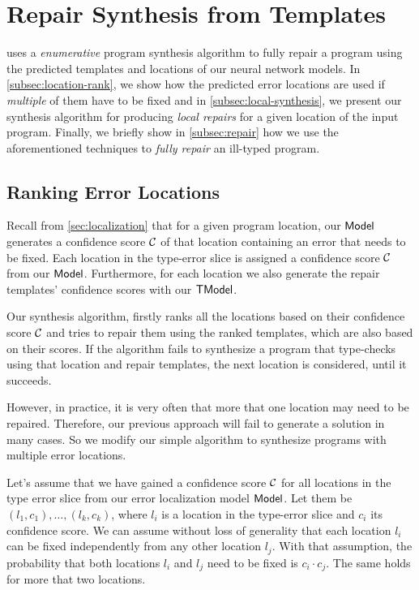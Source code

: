\section{Repair Synthesis from Templates}
\label{sec:synthesis}
\toolname uses a \emph{enumerative} program synthesis algorithm to fully repair
a program using the predicted templates and locations of our neural network
models. In \autoref{subsec:location-rank}, we show how the predicted error
locations are used if \emph{multiple} of them have to be fixed and in
\autoref{subsec:local-synthesis}, we present our synthesis algorithm for
producing \emph{local repairs} for a given location of the input program.
Finally, we briefly show in \autoref{subsec:repair} how we use the
aforementioned techniques to \emph{fully repair} an ill-typed program.

\subsection{Ranking Error Locations}
\label{subsec:location-rank}

Recall from \autoref{sec:localization} that for a given program location, our
$\mathsf{Model}$ generates a confidence score $\mathcal{C}$ of that location containing an
error that needs to be fixed. Each location in the type-error slice is assigned
a confidence score $\mathcal{C}$ from our $\mathsf{Model}$. Furthermore, for each location we
also generate the repair templates' confidence scores with our $\mathsf{TModel}$.

Our synthesis algorithm, firstly ranks all the locations based on their
confidence score $\mathcal{C}$ and tries to repair them using the ranked templates,
which are also based on their scores. If the algorithm fails to synthesize a
program that type-checks using that location and repair templates, the next
location is considered, until it succeeds.

However, in practice, it is very often that more that one location may need to
be repaired. Therefore, our previous approach will fail to generate a solution
in many cases. So we modify our simple algorithm to synthesize programs with
multiple error locations.

Let's assume that we have gained a confidence score $\mathcal{C}$ for all locations
in the type error slice from our error localization model $\mathsf{Model}$. Let them be
$(l_1, c_1), \dots, (l_k, c_k)$, where $l_i$ is a location in the type-error
slice and $c_i$ its confidence score. We can assume without loss of generality
that each location $l_i$ can be fixed independently from any other location
$l_j$. With that assumption, the probability that both locations $l_i$ and $l_j$
need to be fixed is $c_i \cdot c_j$. The same holds for more that two locations.


